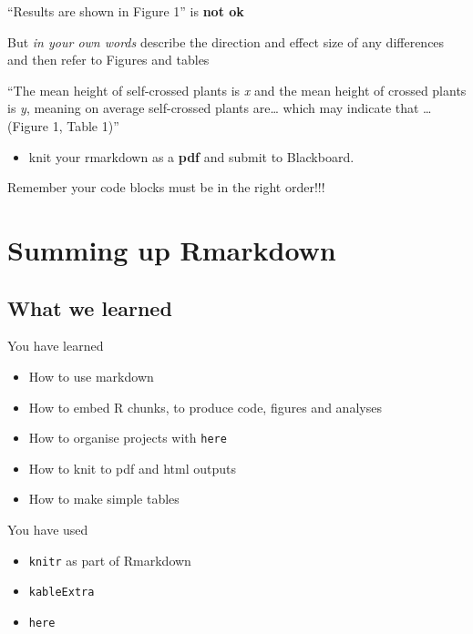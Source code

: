 \documentclass[
]{book}
\makeatletter
\providecommand{\tightlist}{%
  \setlength{\itemsep}{0pt}\setlength{\parskip}{0pt}}
\newenvironment{kframe}{%
\medskip{}
\setlength{\fboxsep}{.8em}
 \def\at@end@of@kframe{}%
 \ifinner\ifhmode%
  \def\at@end@of@kframe{\end{minipage}}%
  \begin{minipage}{\columnwidth}%
 \fi\fi%
 \def\FrameCommand##1{\hskip\@totalleftmargin \hskip-\fboxsep
 \colorbox{shadecolor}{##1}\hskip-\fboxsep
     \hskip-\linewidth \hskip-\@totalleftmargin \hskip\columnwidth}%
 \MakeFramed {\advance\hsize-\width
   \@totalleftmargin\z@ \linewidth\hsize
   \@setminipage}}%
 {\par\unskip\endMakeFramed%
 \at@end@of@kframe}
\newenvironment{block}[1]
  {
  \begin{itemize}
  \renewcommand{\labelitemi}{
    \raisebox{-.7\height}[0pt][0pt]{
      {\setkeys{Gin}{width=3em,keepaspectratio}\texttt{[image: images/\#1]}}
    }
  }
  \setlength{\fboxsep}{1em}
  \begin{kframe}
  \item
  }
  {
  \end{kframe}
  \end{itemize}
  }
\newenvironment{rmdtip}
  {\begin{block}{tip}}
  {\end{block}}
\makeatother
\begin{document}
``Results are shown in Figure 1'' is \textbf{not ok}

But \emph{in your own words} describe the direction and effect size of any differences and then refer to Figures and tables

``The mean height of self-crossed plants is \emph{x} and the mean height of crossed plants is \emph{y}, meaning on average self-crossed plants are\ldots{} which may indicate that \ldots{} (Figure 1, Table 1)''

\begin{itemize}
\tightlist
\item
  knit your rmarkdown as a \textbf{pdf} and submit to Blackboard.
\end{itemize}

\begin{rmdtip}
Remember your code blocks must be in the right order!!!
\end{rmdtip}

\hypertarget{summing-up-rmarkdown}{%
\section{Summing up Rmarkdown}\label{summing-up-rmarkdown}}

\hypertarget{what-we-learned-2}{%
\subsection{What we learned}\label{what-we-learned-2}}

You have learned

\begin{itemize}
\item
  How to use markdown
\item
  How to embed R chunks, to produce code, figures and analyses
\item
  How to organise projects with \texttt{here}
\item
  How to knit to pdf and html outputs
\item
  How to make simple tables
\end{itemize}

You have used

\begin{itemize}
\item
  \texttt{knitr} as part of Rmarkdown
\item
  \texttt{kableExtra} \citet{R-kableExtra}
\item
  \texttt{here} \citet{R-here}
\end{itemize}
\end{document}
